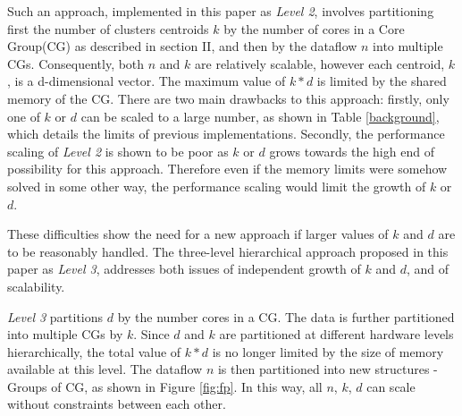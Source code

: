 Such an approach, implemented in this paper as \textit{Level 2}, involves partitioning first the number of clusters centroids $k$ by the number of cores in a Core Group(CG) as described in section II, and then by the dataflow $n$ into multiple CGs. Consequently, both $n$ and $k$ are relatively scalable, however each centroid, $k$, is a d-dimensional vector. The maximum value of $k*d$ is limited by the shared memory of the CG. There are two main drawbacks to this approach: firstly, only one of $k$ or $d$ can be scaled to a large number, as shown in Table \ref{background}, which details the limits of previous implementations. Secondly, the performance scaling of \textit{Level 2} is shown to be poor as $k$ or $d$ grows towards the high end of possibility for this approach. Therefore even if the memory limits were somehow solved in some other way, the performance scaling would limit the growth of $k$ or $d$.

These difficulties show the need for a new approach if larger values of $k$ and $d$ are to be reasonably handled. The three-level hierarchical approach proposed in this paper as \textit{Level 3}, addresses both issues of independent growth of $k$ and $d$, and of scalability. 

\textit{Level 3} partitions $d$ by the number cores in a CG. The data is further partitioned into multiple CGs by $k$. Since $d$ and $k$ are partitioned at different hardware levels hierarchically, the total value of $k*d$ is no longer limited by the size of memory available at this level. The dataflow $n$ is then partitioned into new structures - Groups of CG, as shown in Figure \ref{fig:fp}. In this way, all $n$, $k$, $d$ can scale without constraints between each other.



